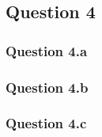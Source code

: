 
\subsection{Question 4}
\label{subsec:414}

\subsubsection{Question 4.a}
\label{subsubsec:414a}

\subsubsection{Question 4.b}
\label{subsubsec:414b}

\subsubsection{Question 4.c}
\label{subsubsec:414c}